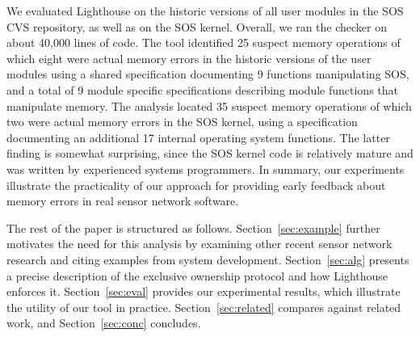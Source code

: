 We evaluated Lighthouse on the historic versions of all user modules in the
SOS CVS repository, as well as on the SOS kernel.  
%
Overall, we ran the checker on about 40,000 lines of code.  
%
The tool identified 25 suspect memory operations of which eight were actual
memory errors in the historic versions of the user modules using a shared
specification documenting 9 functions manipulating SOS, and a total of 9
module specific specifications describing module functions that manipulate
memory.
%
The analysis located 35 suspect memory operations of which two were actual
memory errors in the SOS kernel, using a specification documenting an
additional 17 internal operating system functions.  
%
The latter finding is somewhat surprising, since the SOS kernel code is
relatively mature and was written by experienced systems programmers.  
%
In summary, our experiments illustrate the practicality of our approach for
providing early feedback about memory errors in real sensor network
software.



The rest of the paper is structured as follows.  
%
Section~\ref{sec:example} further motivates the need for this analysis by
examining other recent sensor network research and citing examples from
system development.
%
Section~\ref{sec:alg} presents a precise description of the exclusive
ownership protocol and how Lighthouse enforces it.  
%
Section~\ref{sec:eval} provides our experimental results, which illustrate
the utility of our tool in practice.  
%
Section~\ref{sec:related} compares against related work, and
Section~\ref{sec:conc} concludes.



